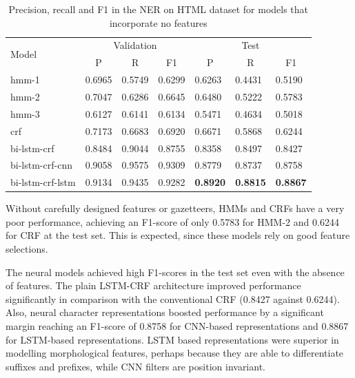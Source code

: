 \documentclass{nle}
\begin{document}
\begin{table}[h]
  \small
  \begin{center}
    \begin{tabular}{ lllllll }
      \toprule
      \multirow{2}{*}{Model} & \multicolumn{3}{c}{Validation} & \multicolumn{3}{c}{Test} \\
                             & \multicolumn{1}{c}{P} & \multicolumn{1}{c}{R} & \multicolumn{1}{c}{F1}
                             & \multicolumn{1}{c}{P} & \multicolumn{1}{c}{R} & \multicolumn{1}{c}{F1} \\
      \midrule
      hmm-1	       & 0.6965 & 0.5749 & 0.6299 & 0.6263 & 0.4431 & 0.5190 \\
      hmm-2	       & 0.7047 & 0.6286 & 0.6645 & 0.6480 & 0.5222 & 0.5783 \\
      hmm-3	       & 0.6127 & 0.6141 & 0.6134 & 0.5471 & 0.4634 & 0.5018 \\
      crf	       & 0.7173 & 0.6683 & 0.6920 & 0.6671 & 0.5868 & 0.6244 \\
      bi-lstm-crf      & 0.8484 & 0.9044 & 0.8755 & 0.8358 & 0.8497 & 0.8427 \\
      bi-lstm-crf-cnn  & 0.9058 & 0.9575 & 0.9309 & 0.8779 & 0.8737 & 0.8758 \\
      bi-lstm-crf-lstm & 0.9134 & 0.9435 & 0.9282 & \textbf{0.8920} & \textbf{0.8815} & \textbf{0.8867} \\
      \bottomrule
    \end{tabular}
  \end{center}
  \caption{Precision, recall and F1 in the NER on HTML dataset for models that incorporate no features}
  \label{tab:experiment1}
\end{table}

Without carefully designed features or gazetteers, HMMs and CRFs have a very 
poor performance, achieving an F1-score of only 0.5783 for HMM-2 and 0.6244 for CRF
at the test set. This is expected, since these models rely on good feature selections.

The neural models achieved high F1-scores in the test
set even with the absence of features. The plain LSTM-CRF architecture improved performance 
significantly in comparison with the conventional CRF (0.8427 against 0.6244). 
Also, neural character representations boosted performance by a significant margin
reaching an F1-score of 0.8758 for CNN-based representations and 0.8867 for LSTM-based
representations. LSTM based representations were superior in modelling
morphological features, perhaps because they are able to differentiate suffixes 
and prefixes, while CNN filters are position invariant. 
\end{document}
